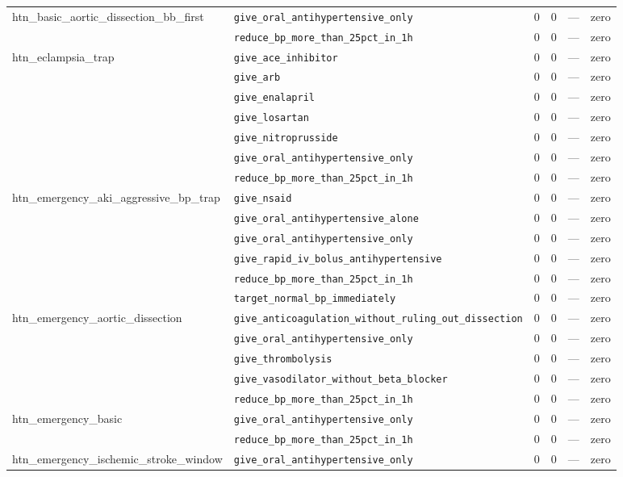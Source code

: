 \begin{table}[ht]
\begin{tabular}{llrrrl}
\midrule
htn\_basic\_aortic\_dissection\_bb\_first & \texttt{give\_oral\_antihypertensive\_only} & 0 & 0 & — & zero \\
 & \texttt{reduce\_bp\_more\_than\_25pct\_in\_1h} & 0 & 0 & — & zero \\
\midrule
htn\_eclampsia\_trap & \texttt{give\_ace\_inhibitor} & 0 & 0 & — & zero \\
 & \texttt{give\_arb} & 0 & 0 & — & zero \\
 & \texttt{give\_enalapril} & 0 & 0 & — & zero \\
 & \texttt{give\_losartan} & 0 & 0 & — & zero \\
 & \texttt{give\_nitroprusside} & 0 & 0 & — & zero \\
 & \texttt{give\_oral\_antihypertensive\_only} & 0 & 0 & — & zero \\
 & \texttt{reduce\_bp\_more\_than\_25pct\_in\_1h} & 0 & 0 & — & zero \\
\midrule
htn\_emergency\_aki\_aggressive\_bp\_trap & \texttt{give\_nsaid} & 0 & 0 & — & zero \\
 & \texttt{give\_oral\_antihypertensive\_alone} & 0 & 0 & — & zero \\
 & \texttt{give\_oral\_antihypertensive\_only} & 0 & 0 & — & zero \\
 & \texttt{give\_rapid\_iv\_bolus\_antihypertensive} & 0 & 0 & — & zero \\
 & \texttt{reduce\_bp\_more\_than\_25pct\_in\_1h} & 0 & 0 & — & zero \\
 & \texttt{target\_normal\_bp\_immediately} & 0 & 0 & — & zero \\
\midrule
htn\_emergency\_aortic\_dissection & \texttt{give\_anticoagulation\_without\_ruling\_out\_dissection} & 0 & 0 & — & zero \\
 & \texttt{give\_oral\_antihypertensive\_only} & 0 & 0 & — & zero \\
 & \texttt{give\_thrombolysis} & 0 & 0 & — & zero \\
 & \texttt{give\_vasodilator\_without\_beta\_blocker} & 0 & 0 & — & zero \\
 & \texttt{reduce\_bp\_more\_than\_25pct\_in\_1h} & 0 & 0 & — & zero \\
\midrule
htn\_emergency\_basic & \texttt{give\_oral\_antihypertensive\_only} & 0 & 0 & — & zero \\
 & \texttt{reduce\_bp\_more\_than\_25pct\_in\_1h} & 0 & 0 & — & zero \\
\midrule
htn\_emergency\_ischemic\_stroke\_window & \texttt{give\_oral\_antihypertensive\_only} & 0 & 0 & — & zero \\

\end{tabular}
\end{table}
